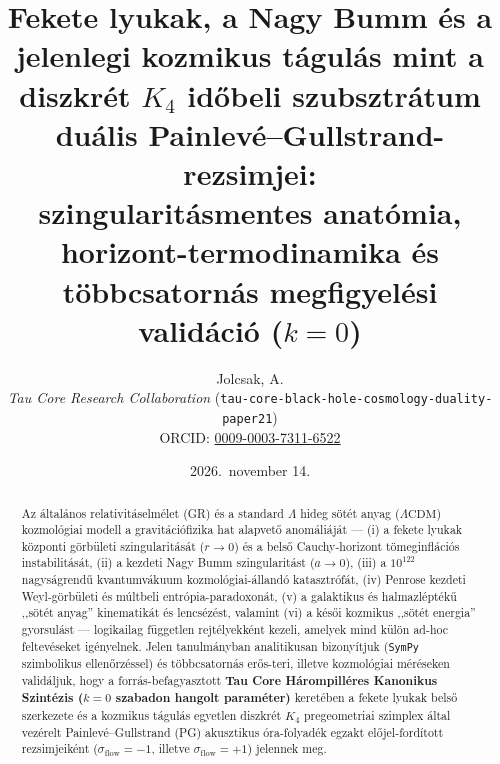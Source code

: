 \documentclass[11pt,a4paper]{article}
\title{\textbf{Fekete lyukak, a Nagy Bumm \'es a jelenlegi kozmikus t\'agul\'as mint a diszkr\'et $K_4$ id\H{o}beli szubsztr\'atum du\'alis Painlev\'e--Gullstrand-rezsimjei:\\
szingularit\'asmentes anat\'omia, horizont-termodinamika \'es t\"obbcsatorn\'as megfigyel\'esi valid\'aci\'o ($k = 0$)}}
\author{Jolcsak, A.\\
\small\textit{Tau Core Research Collaboration} (\texttt{tau-core-black-hole-cosmology-duality-paper21})\\{\small ORCID: \href{https://orcid.org/0009-0003-7311-6522}{0009-0003-7311-6522}}}
\date{2026.\ november 14.}
\theoremstyle{remark}
\begin{document}
\maketitle

\begin{abstract}
\noindent
Az \'altal\'anos relativit\'aselm\'elet (GR) \'es a standard $\Lambda$ hideg s\"ot\'et anyag ($\Lambda\mathrm{CDM}$) kozmol\'ogiai modell a gravit\'aci\'ofizika hat alapvet\H{o} anom\'ali\'aj\'at --- (i) a fekete lyukak k\"ozponti g\"orb\"uleti szingularit\'as\'at ($r \to 0$) \'es a bels\H{o} Cauchy-horizont t\"omeginfl\'aci\'os instabilit\'as\'at, (ii) a kezdeti Nagy Bumm szingularit\'ast ($a \to 0$), (iii) a $10^{122}$ nagys\'agrend\H{u} kvantumv\'akuum kozmol\'ogiai-\'alland\'o katasztr\'of\'at, (iv) Penrose kezdeti Weyl-g\"orb\"uleti \'es m\'ultbeli entr\'opia-paradoxon\'at, (v) a galaktikus \'es halmazl\'ept\'ek\H{u} ,,s\"ot\'et anyag'' kinematik\'at \'es lencs\'ez\'est, valamint (vi) a k\'es\H{o}i kozmikus ,,s\"ot\'et energia'' gyorsul\'ast --- logikailag f\"uggetlen rejt\'elyekk\'ent kezeli, amelyek mind k\"ul\"on ad-hoc feltev\'eseket ig\'enyelnek. Jelen tanulm\'anyban analitikusan bizony\'itjuk (\texttt{SymPy} szimbolikus ellen\H{o}rz\'essel) \'es t\"obbcsatorn\'as er\H{o}s-teri, illetve kozmol\'ogiai m\'er\'eseken valid\'aljuk, hogy a forr\'as-befagyasztott \textbf{Tau Core H\'arompill\'eres Kanonikus Szint\'ezis ($k = 0$ szabadon hangolt param\'eter)} keret\'eben a fekete lyukak bels\H{o} szerkezete \'es a kozmikus t\'agul\'as egyetlen diszkr\'et $K_4$ pregeometriai szimplex \'altal vez\'erelt Painlev\'e--Gullstrand (PG) akusztikus \'ora-folyad\'ek egzakt el\H{o}jel-ford\'itott rezsimjeik\'ent ($\sigma_{\mathrm{flow}} = -1$, illetve $\sigma_{\mathrm{flow}} = +1$) jelennek meg.


\end{abstract}
\end{document}
